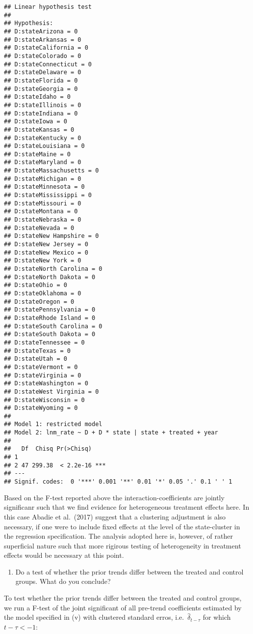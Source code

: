 \documentclass[
]{article}
\providecommand{\tightlist}{%
  \setlength{\itemsep}{0pt}\setlength{\parskip}{0pt}}
\begin{document}
\begin{verbatim}
## Linear hypothesis test
## 
## Hypothesis:
## D:stateArizona = 0
## D:stateArkansas = 0
## D:stateCalifornia = 0
## D:stateColorado = 0
## D:stateConnecticut = 0
## D:stateDelaware = 0
## D:stateFlorida = 0
## D:stateGeorgia = 0
## D:stateIdaho = 0
## D:stateIllinois = 0
## D:stateIndiana = 0
## D:stateIowa = 0
## D:stateKansas = 0
## D:stateKentucky = 0
## D:stateLouisiana = 0
## D:stateMaine = 0
## D:stateMaryland = 0
## D:stateMassachusetts = 0
## D:stateMichigan = 0
## D:stateMinnesota = 0
## D:stateMississippi = 0
## D:stateMissouri = 0
## D:stateMontana = 0
## D:stateNebraska = 0
## D:stateNevada = 0
## D:stateNew Hampshire = 0
## D:stateNew Jersey = 0
## D:stateNew Mexico = 0
## D:stateNew York = 0
## D:stateNorth Carolina = 0
## D:stateNorth Dakota = 0
## D:stateOhio = 0
## D:stateOklahoma = 0
## D:stateOregon = 0
## D:statePennsylvania = 0
## D:stateRhode Island = 0
## D:stateSouth Carolina = 0
## D:stateSouth Dakota = 0
## D:stateTennessee = 0
## D:stateTexas = 0
## D:stateUtah = 0
## D:stateVermont = 0
## D:stateVirginia = 0
## D:stateWashington = 0
## D:stateWest Virginia = 0
## D:stateWisconsin = 0
## D:stateWyoming = 0
## 
## Model 1: restricted model
## Model 2: lnm_rate ~ D + D * state | state + treated + year
## 
##   Df  Chisq Pr(>Chisq)    
## 1                         
## 2 47 299.38  < 2.2e-16 ***
## ---
## Signif. codes:  0 '***' 0.001 '**' 0.01 '*' 0.05 '.' 0.1 ' ' 1
\end{verbatim}

Based on the F-test reported above the interaction-coefficients are
jointly significanr such that we find evidence for heterogeneous
treatment effects here. In this case Abadie et al.~(2017) suggest that a
clustering adjustment is also necessary, if one were to include fixed
effects at the level of the state-cluster in the regression
specification. The analysis adopted here is, however, of rather
superficial nature such that more rigirous testing of heterogeneity in
treatment effects would be necessary at this point.

\begin{enumerate}
\def\labelenumi{\roman{enumi})}
\setcounter{enumi}{6}
\tightlist
\item
  Do a test of whether the prior trends differ between the treated and
  control groups. What do you conclude?
\end{enumerate}

To test whether the prior trends differ between the treated and control
groups, we run a F-test of the joint significant of all pre-trend
coefficients estimated by the model specified in (v) with clustered
standard erros, i.e.~\(\hat{\delta}_{t-\tau}\) for which \(t-\tau<-1\):
\end{document}
